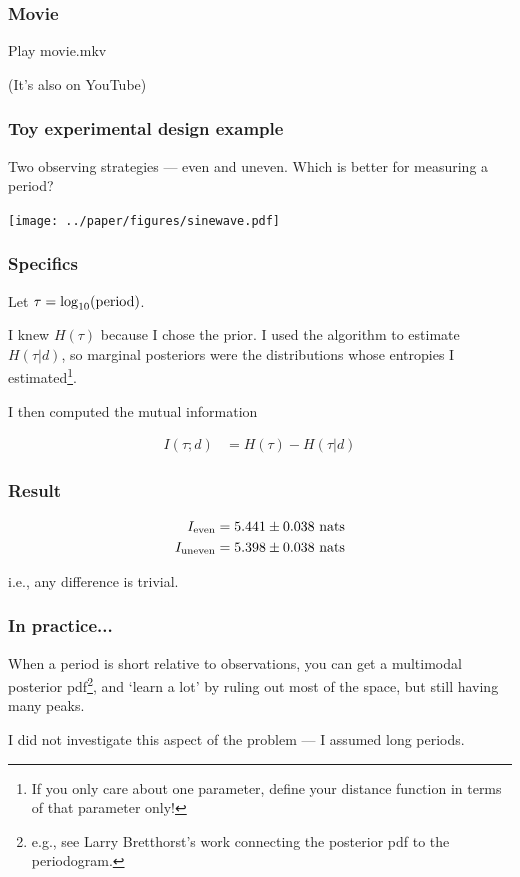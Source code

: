\documentclass{beamer}
\begin{document}
\begin{frame}
\frametitle{Movie}

Play movie.mkv

(It's also on YouTube)

\end{frame}


\begin{frame}
\frametitle{Toy experimental design example}
Two observing strategies --- even and uneven.
Which is better for measuring a period?

\begin{center}
\texttt{[image: ../paper/figures/sinewave.pdf]}
\end{center}

\end{frame}


\begin{frame}
\frametitle{Specifics}
Let $\tau = \log_{10}(\textnormal{period})$.\vspace{0.5em}

I knew $H(\tau)$ because I chose
the prior. I used the algorithm to estimate $H(\tau | d)$,
so marginal posteriors
were the distributions whose entropies I estimated\footnote{If you only
care about one parameter, define your distance function in terms of that
parameter only!}.\vspace{0.5em}

I then computed the mutual information
\vspace{0.5em}

\begin{align}
I(\tau; d) &= H(\tau) - H(\tau | d)
\end{align}

\end{frame}

\begin{frame}
\frametitle{Result}

\begin{align}
I_{\rm even}   &= 5.441 \pm 0.038 \textnormal{ nats}\\
I_{\rm uneven} &= 5.398 \pm 0.038 \textnormal{ nats}
\end{align}

i.e., any difference is trivial.

\end{frame}


\begin{frame}
\frametitle{In practice...}

When a period is short relative to observations, you can get a multimodal
posterior pdf\footnote{e.g., see Larry Bretthorst's work connecting
the posterior pdf to the periodogram.},
and `learn a lot' by ruling out most of the space, but still
having many peaks.\vspace{0.5em}

I did not investigate this aspect of the problem --- I assumed long periods.

\end{frame}
\end{document}
